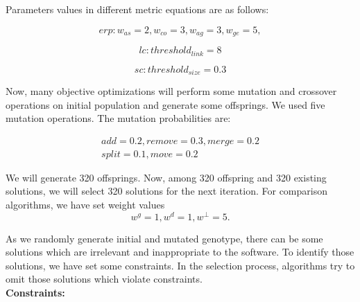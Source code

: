 \documentclass[letterpaper, 10 pt, conference]{ieeeconf}  %
\begin{document}
Parameters values in different metric equations are as follows:

\begin{equation}
erp:
w_{as}=2 , 
w_{co}=3, 
w_{ag}=3 ,
w_{ge}=5,
\end{equation}

\begin{equation}
lc:
threshold_{link}=8
\end{equation}

\begin{equation}
sc:
threshold_{size}=0.3
\end{equation}

Now, many objective optimizations will perform some mutation and crossover operations on initial population and generate some offsprings. 
We used five mutation operations. The mutation probabilities are:


\begin{displaymath}
\begin{array}{l}
add=0.2 ,
remove=0.3 ,
merge=0.2 \\
split=0.1 ,
move=0.2
\end{array}
\end{displaymath}


We will generate 320 offsprings. Now, among 320 offspring and 320 existing solutions, we will select 320 solutions for the next iteration.   
For comparison algorithms, we have set weight values
\begin{equation}\label{weight_valued}
w^g=1,w^d=1,w^{\perp}=5.    
\end{equation}
 

As we randomly generate initial and mutated genotype, there can be some solutions which are irrelevant and inappropriate to the software. To identify those solutions, we have set some constraints. In the selection process, algorithms try to omit those solutions which violate constraints. \\

\textbf{Constraints:}
\end{document}
